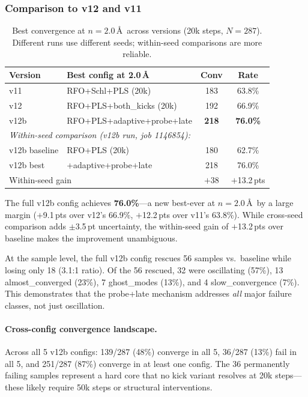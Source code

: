 \documentclass[11pt,a4paper]{article}
\theoremstyle{definition}
\begin{document}
\subsubsection{Comparison to v12 and v11}
\label{sec:v12b-vs-prior}

\begin{table}[h]
\centering
\caption{Best convergence at $n=2.0$\,\AA\ across versions (20k steps,
  $N=287$).  Different runs use different seeds; within-seed comparisons
  are more reliable.}
\label{tab:v12b-vs-prior}
\begin{tabular}{llcc}
\toprule
Version & Best config at 2.0\,\AA & Conv & Rate \\
\midrule
v11     & RFO+Schl+PLS (20k)          & 183 & 63.8\% \\
v12     & RFO+PLS+both\_kicks (20k)   & 192 & 66.9\% \\
v12b    & RFO+PLS+adaptive+probe+late & \textbf{218} & \textbf{76.0\%} \\
\midrule
\multicolumn{4}{l}{\emph{Within-seed comparison (v12b run, job 1146854):}} \\
\midrule
v12b baseline & RFO+PLS (20k)           & 180 & 62.7\% \\
v12b best     & +adaptive+probe+late     & 218 & 76.0\% \\
\multicolumn{2}{l}{Within-seed gain}     & $+$38 & $+$13.2\,pts \\
\bottomrule
\end{tabular}
\end{table}

The full v12b config achieves \textbf{76.0\%}---a new best-ever at
$n=2.0$\,\AA\ by a large margin ($+$9.1\,pts over v12's 66.9\%,
$+$12.2\,pts over v11's 63.8\%).  While cross-seed comparison adds
$\pm$3.5\,pt uncertainty, the within-seed gain of $+$13.2\,pts over
baseline makes the improvement unambiguous.

At the sample level, the full v12b config rescues 56 samples vs.\
baseline while losing only 18 (3.1:1 ratio).  Of the 56 rescued,
32 were oscillating (57\%), 13 almost\_converged (23\%), 7 ghost\_modes
(13\%), and 4 slow\_convergence (7\%).  This demonstrates that the
probe+late mechanism addresses \emph{all} major failure classes, not
just oscillation.

\paragraph{Cross-config convergence landscape.}
Across all 5 v12b configs: 139/287 (48\%) converge in all 5, 36/287
(13\%) fail in all 5, and 251/287 (87\%) converge in at least one config.
The 36 permanently failing samples represent a hard core that no kick
variant resolves at 20k steps---these likely require 50k steps or
structural interventions.
\end{document}

